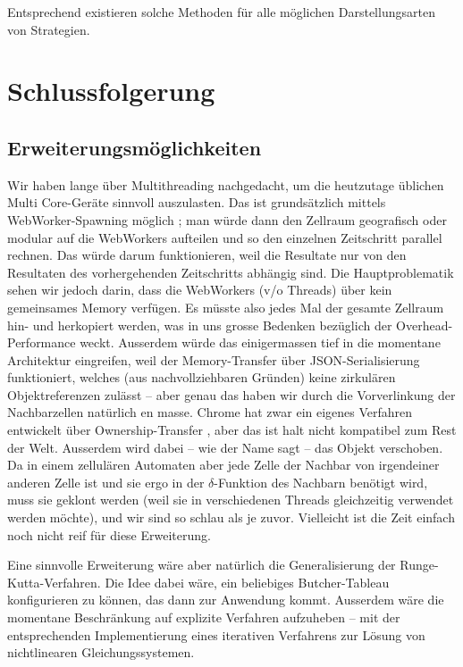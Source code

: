 \documentclass[11pt]{scrreprt} %
\theoremstyle{definition}
\begin{document}
Entsprechend existieren solche Methoden für alle möglichen Darstellungsarten von Strategien.

\chapter{Schlussfolgerung}

\section{Erweiterungsmöglichkeiten}

Wir haben lange über Multithreading nachgedacht, um die heutzutage üblichen Multi Core-Geräte sinnvoll auszulasten. Das ist grundsätzlich mittels WebWorker-Spawning möglich \cite{mdn:WebWorkers}; man würde dann den Zellraum geografisch oder modular auf die WebWorkers aufteilen und so den einzelnen Zeitschritt parallel rechnen. Das würde darum funktionieren, weil die Resultate nur von den Resultaten des vorhergehenden Zeitschritts abhängig sind. Die Hauptproblematik sehen wir jedoch darin, dass die WebWorkers (v/o Threads)  über kein gemeinsames Memory verfügen. Es müsste also jedes Mal der gesamte Zellraum hin- und herkopiert werden, was in uns grosse Bedenken bezüglich der Overhead-Performance weckt. Ausserdem würde das einigermassen tief in die momentane Architektur eingreifen, weil der Memory-Transfer über JSON-Serialisierung funktioniert, welches (aus nachvollziehbaren Gründen) keine zirkulären Objektreferenzen zulässt -- aber genau das haben wir durch die Vorverlinkung der Nachbarzellen natürlich en masse. Chrome hat zwar ein eigenes Verfahren entwickelt über Ownership-Transfer \cite{lightningFast}, aber das ist halt nicht kompatibel zum Rest der Welt. Ausserdem wird dabei -- wie der Name sagt -- das Objekt verschoben. Da in einem zellulären Automaten aber jede Zelle der Nachbar von irgendeiner anderen Zelle ist und sie ergo in der $\delta$-Funktion des Nachbarn benötigt wird, muss sie geklont werden (weil sie in verschiedenen Threads gleichzeitig verwendet werden möchte), und wir sind so schlau als je zuvor. Vielleicht ist die Zeit einfach noch nicht reif für diese Erweiterung.

Eine sinnvolle Erweiterung wäre aber natürlich die Generalisierung der Runge-Kutta-Verfahren. Die Idee dabei wäre, ein beliebiges Butcher-Tableau konfigurieren zu können, das dann zur Anwendung kommt. Ausserdem wäre die momentane Beschränkung auf explizite Verfahren aufzuheben -- mit der entsprechenden Implementierung eines iterativen Verfahrens zur Lösung von nichtlinearen Gleichungssystemen.
\end{document}
